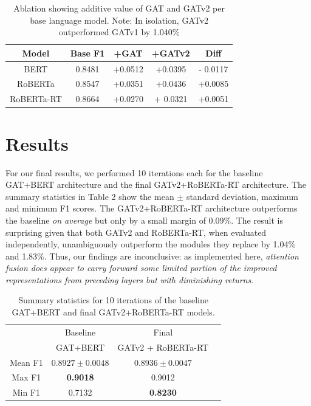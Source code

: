 \documentclass[letterpaper]{article} %
\begin{document}
\begin{table}
    \begin{tabular}{|c|c|c|c|c|}
        \hline
        \hline 
        Model & Base F1 & +GAT & +GATv2 & Diff \\
        \hline
        BERT & 0.8481 & +0.0512 &  +0.0395 & - 0.0117\\
        RoBERTa & 0.8547 & +0.0351 & +0.0436 & +0.0085\\
        RoBERTa-RT & 0.8664 & +0.0270 & + 0.0321 & +0.0051 \\
        \hline
    \end{tabular}
    \caption{Ablation showing additive value of GAT and GATv2 per base language model. Note: In isolation, GATv2 outperformed GATv1 by 1.040\% }
\end{table}

\section{Results}

For our final results, we performed 10 iterations each for the baseline GAT+BERT architecture and the final GATv2+RoBERTa-RT architecture. The summary statistics in Table 2 show the mean $\pm$ standard deviation, maximum and minimum F1 scores. The GATv2+RoBERTa-RT architecture outperforms the baseline \textit{on average} but only by a small margin of 0.09\%. The result is surprising given that both GATv2 and RoBERTa-RT, when evaluated independently, unambiguously outperform the modules they replace by 1.04\% and 1.83\%. Thus, our findings are inconclusive: as implemented here, \textit{attention fusion does appear to carry forward some limited portion of the improved representations from preceding layers but with diminishing returns}. 

\begin{table}
    \begin{tabular}{|c||c|c|c|}
        \hline
        \hline 
         & Baseline & Final  \\
         & GAT+BERT & GATv2 + RoBERTa-RT  \\
        \hline
        Mean F1  & $0.8927\pm0.0048$ & $\mathbf{0.8936 \pm 0.0047}$  \\
        Max F1 & \textbf{0.9018} & 0.9012 \\
        Min F1 & 0.7132 & \textbf{0.8230} \\
        \hline
    \end{tabular}
    \caption{Summary statistics for 10 iterations of the baseline GAT+BERT and final GATv2+RoBERTa-RT models.}
\end{table}
\end{document}

